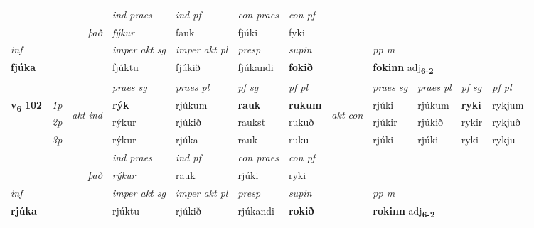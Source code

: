 \begin{longtable}[l]{X>{\footnotesize\itshape}llXXXXlXXXX}
   && &  \textit{ind praes} & \textit{ind pf} & \textit{con praes} & \textit{con pf} \\*
\multicolumn{3}{r}{\textit{það}} & fýkur & fauk & fjúki & fyki \\*

\cmidrule{4-7}
   {\textit{inf}} & &  & \textit{imper akt sg} & \textit{imper akt pl}   & \textit{presp} & \textit{supin}  && \textit{pp m} \\*
  {\textbf{fjúka}} & && fjúktu  & fjúkið   & fjúkandi &  \textbf{fokið}  && \multicolumn{2}{l}{\textbf{fokinn} adj\textbf{\textsubscript{6-2}}} \\*

\midrule

 & &   & \textit{praes sg}  & \textit{praes pl}    & \textit{ pf sg} & \textit{pf pl} & & \textit{praes sg}  & \textit{praes pl}    & \textit{pf sg} & \textit{pf pl }  \\ \cmidrule{4-7} \cmidrule{9-12}
 \multirow{2}{*}{{{\textbf{v{\textsubscript{6}}} \Large{\textbf{102}}}}}  & 1p & \multirow{3}{*}{\begin{turn}{90}\textit{akt ind}\end{turn}} & \textbf{rýk} & rjúkum & \textbf{rauk} & \textbf{rukum} & \multirow{3}{*}{\begin{turn}{90}\textit{akt con}\end{turn}} &rjúki & rjúkum & \textbf{ryki} & rykjum\\*
 & 2p &  &  rýkur  & rjúkið & raukst & rukuð & & rjúkir & rjúkið & rykir & rykjuð \\*
 & 3p &  & rýkur & rjúka & rauk & ruku & & rjúki & rjúki& ryki & rykju \\*
\cmidrule{4-7} \cmidrule{9-12}

   && &  \textit{ind praes} & \textit{ind pf} & \textit{con praes} & \textit{con pf} \\*
\multicolumn{3}{r}{\textit{það}} & rýkur & rauk & rjúki & ryki \\*

\cmidrule{4-7}
   {\textit{inf}} & &  & \textit{imper akt sg} & \textit{imper akt pl}   & \textit{presp} & \textit{supin}  && \textit{pp m} \\*
  {\textbf{rjúka}} & && rjúktu  & rjúkið   & rjúkandi &  \textbf{rokið}  && \multicolumn{2}{l}{\textbf{rokinn} adj\textbf{\textsubscript{6-2}}} \\*

\midrule


\end{longtable}
